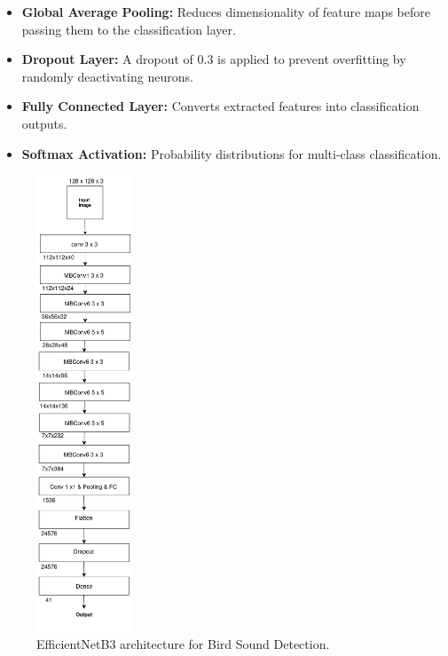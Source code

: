 \begin{itemize}
\begin{itemize}
                  \item \textbf{Global Average Pooling:} Reduces dimensionality of feature maps before passing them to the classification layer.
                  
                  \item \textbf{Dropout Layer:} A dropout of 0.3 is applied to prevent overfitting by randomly deactivating neurons.
                  
                  \item \textbf{Fully Connected Layer:} Converts extracted features into classification outputs.
                  
                  \item \textbf{Softmax Activation:} Probability distributions for multi-class classification.
            \end{itemize}
            \begin{figure}[h!]
                  \centering
                  \includegraphics[width=0.25\textwidth]{images/MajorProject-efficientNetB3 architecture.png}
                  \caption{EfficientNetB3 architecture for Bird Sound Detection.}

\end{figure}
\end{itemize}
